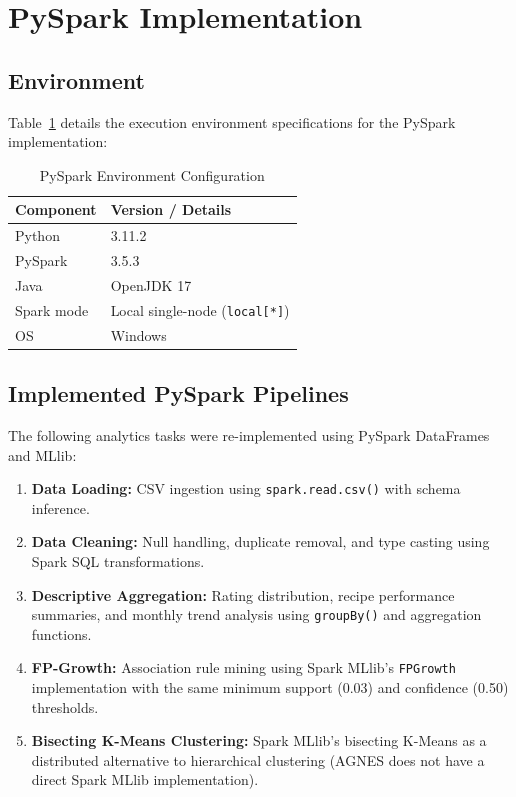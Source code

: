 \documentclass[12pt,a4paper]{article}
\begin{document}
\section{PySpark Implementation}

\subsection{Environment}

Table~\ref{tab:spark_env} details the execution environment specifications for the PySpark implementation:

\begin{table}[H]
\centering
\caption{PySpark Environment Configuration}
\label{tab:spark_env}
\begin{tabular}{l l}
\toprule
\textbf{Component} & \textbf{Version / Details} \\
\midrule
Python     & 3.11.2 \\
PySpark    & 3.5.3 \\
Java       & OpenJDK 17 \\
Spark mode & Local single-node (\texttt{local[*]}) \\
OS         & Windows \\
\bottomrule
\end{tabular}
\end{table}

\subsection{Implemented PySpark Pipelines}

The following analytics tasks were re-implemented using PySpark DataFrames and MLlib:

\begin{enumerate}[nosep]
    \item \textbf{Data Loading:} CSV ingestion using \texttt{spark.read.csv()} with schema inference.
    \item \textbf{Data Cleaning:} Null handling, duplicate removal, and type casting using Spark SQL transformations.
    \item \textbf{Descriptive Aggregation:} Rating distribution, recipe performance summaries, and monthly trend analysis using \texttt{groupBy()} and aggregation functions.
    \item \textbf{FP-Growth:} Association rule mining using Spark MLlib's \texttt{FPGrowth} implementation with the same minimum support (0.03) and confidence (0.50) thresholds.
    \item \textbf{Bisecting K-Means Clustering:} Spark MLlib's bisecting K-Means as a distributed alternative to hierarchical clustering (AGNES does not have a direct Spark MLlib implementation).
\end{enumerate}
\end{document}
